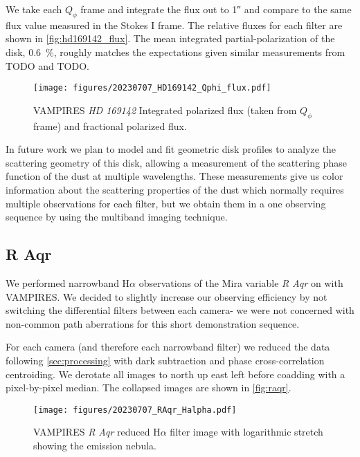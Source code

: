 We take each $Q_\phi$ frame and integrate the flux out to \ang{;;1} and compare to the same flux value measured in the Stokes I frame. The relative fluxes for each filter are shown in \autoref{fig:hd169142_flux}. The mean integrated partial-polarization of the disk, \SI{0.6}{\%}, roughly matches the expectations given similar measurements from TODO and TODO. 

\begin{figure}
    \centering
    \texttt{[image: figures/20230707\_HD169142\_Qphi\_flux.pdf]}
    \caption{ VAMPIRES \textit{HD 169142} Integrated polarized flux (taken from $Q_\phi$ frame) and fractional polarized flux.\label{fig:hd169142_flux}}
\end{figure}

In future work we plan to model and fit geometric disk profiles to analyze the scattering geometry of this disk, allowing a measurement of the scattering phase function of the dust at multiple wavelengths. These measurements give us color information about the scattering properties of the dust which normally requires multiple observations for each filter, but we obtain them in a one observing sequence by using the multiband imaging technique.

\subsection{R Aqr\label{sec:raqr}}

We performed narrowband H$\alpha$ observations of the Mira variable \textit{R Aqr} on  with VAMPIRES. We decided to slightly increase our observing efficiency by not switching the differential filters between each camera- we were not concerned with non-common path aberrations for this short demonstration sequence.

For each camera (and therefore each narrowband filter) we reduced the data following \autoref{sec:processing} with dark subtraction and phase cross-correlation centroiding. We derotate all images to north up east left before coadding with a pixel-by-pixel median. The collapsed images are shown in \autoref{fig:raqr}.

\begin{figure}
    \centering
    \texttt{[image: figures/20230707\_RAqr\_Halpha.pdf]}
    \caption{ VAMPIRES \textit{R Aqr} reduced H$\alpha$ filter image with logarithmic stretch showing the emission nebula.\label{fig:raqr}}
\end{figure}

